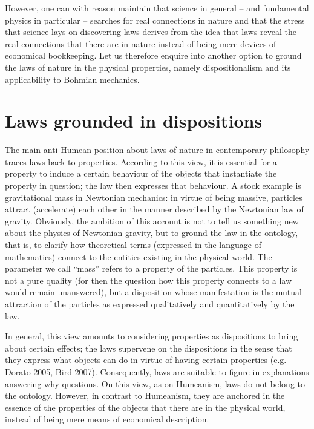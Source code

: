 \documentclass[12pt,a4paper]{article}
\theoremstyle{definition}
\begin{document}
However, one can with reason maintain that science in general -- and fundamental physics in particular -- searches for real connections in nature and that the stress that science lays on discovering laws derives from the idea that laws reveal the real connections that there are in nature instead of being mere devices of economical bookkeeping. Let us therefore enquire into another option to ground the laws of nature in the physical properties, namely dispositionalism and its applicability to Bohmian mechanics.

\section{Laws grounded in dispositions}
The main anti-Humean position about laws of nature in contemporary philosophy traces laws back to properties. According to this view, it is essential for a property to induce a certain behaviour of the objects that instantiate the property in question; the law then expresses that behaviour. A stock example is gravitational mass in Newtonian mechanics: in virtue of being massive, particles attract (accelerate) each other in the manner described by the Newtonian law of gravity. Obviously, the ambition of this account is not to tell us something new about the physics of Newtonian gravity, but to ground the law in the ontology, that is, to clarify how theoretical terms (expressed in the language of mathematics) connect to the entities existing in the physical world. The parameter we call ``mass'' refers to a property of the particles. This property is not a pure quality (for then the question how this property connects to a law would remain unanswered), but a disposition whose manifestation is the mutual attraction of the particles as expressed qualitatively and quantitatively by the law.

In general, this view amounts to considering properties as dispositions to bring about certain effects; the laws supervene on the dispositions in the sense that they express what objects can do in virtue of having certain properties (e.g. Dorato 2005, Bird 2007). Consequently, laws are suitable to figure in explanations answering why-questions. On this view, as on Humeanism, laws do not belong to the ontology. However, in contrast to Humeanism, they are anchored in the essence of the properties of the objects that there are in the physical world, instead of being mere means of economical description.
\end{document}
